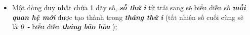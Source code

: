 \begin{itemize}
	\item     Một dòng duy nhất chứa 1 dãy số,    \emph{\textbf{      số thứ i     }}    từ trái sang sẽ biểu diễn số    \emph{\textbf{      mối quan hệ mới     }}    được tạo thành trong    \emph{\textbf{      tháng thứ i     }}    (tất nhiên số cuối cùng sẽ là    \emph{\textbf{      0 -     }}    biểu diễn    \emph{\textbf{      tháng bão hòa     }}    );   
\end{itemize}